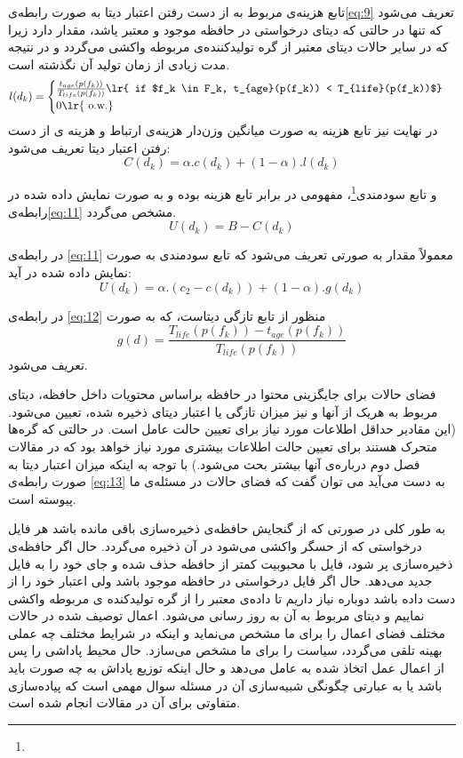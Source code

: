  تابع هزینه‌ی مربوط به از دست رفتن اعتبار دیتا به صورت رابطه‌ی\ref{eq:9} تعریف می‌شود که تنها در حالتی که دیتای درخواستی در حافظه موجود و معتبر یاشد، مقدار دارد زیرا که در سایر حالات دیتای معتبر از گره تولیدکننده‌ی مربوطه واکشی می‌گردد و در نتیجه مدت زیادی از زمان تولید آن نگذشته است. 
 \begin{equation}\label{eq:9}
 	l(d_k) = \begin{cases}
 		\frac{t_{age}(p(f_k))}{T_{life}(p(f_k))} \text{\lr{ if $f_k \in F_k, t_{age}(p(f_k)) < T_{life}(p(f_k))$}}\\
 		0 \text{\lr{ o.w.}}
 	\end{cases}
 \end{equation}  
  در نهایت نیز تابع هزینه به صورت میانگین وزن‌دار هزینه‌ی ارتباط و هزینه ی از دست رفتن اعتبار دیتا تعریف می‌شود:
  \begin{equation}\label{eq:10}
  	C(d_k) = \alpha . c(d_k) + (1 - \alpha) . l(d_k)
  \end{equation}

و تابع سودمندی\footnote{}، مفهومی در برابر تابع هزینه بوده و به صورت نمایش داده شده در رابطه‌ی\ref{eq:11} مشخص می‌گردد.
\begin{equation}\label{eq:11}
	U(d_k) = B - C(d_k)
\end{equation}

در رابطه‌ی \ref{eq:11} معمولاً مقدار  به صورتی تعریف می‌شود که تابع سودمندی به صورت نمایش داده شده در آید:
\begin{equation}\label{eq:12}
	U(d_k) = \alpha . (c_2 - c(d_k)) + (1 - \alpha) . g(d_k)
\end{equation}

در رابطه‌ی \ref{eq:12} منظور از تابع  تازگی دیتاست، که به صورت 
\begin{equation}\label{eq:13}
	g(d) = \frac{T_{life}(p(f_k)) - t_{age}(p(f_k))}{T_{life}(p(f_k))} 
\end{equation}  
تعریف می‌شود.

فضای حالات برای جایگزینی محتوا در حافظه براساس محتویات داخل حافظه، دیتای مربوط به هریک از آنها و نیز میزان تازگی یا اعتبار دیتای ذخیره شده، تعیین می‌شود. (این مقادیر حداقل اطلاعات مورد نیاز برای تعیین حالت عامل است. در حالتی که گره‌ها متحرک هستند برای تعیین حالت اطلاعات بیشتری مورد نیاز خواهد بود که در مقالات فصل دوم درباره‌ی آنها بیشتر بحث می‌شود.) با توجه به اینکه میزان اعتبار دیتا به صورت رابطه‌ی \ref{eq:13} به دست می‌آید می توان گفت که فضای حالات در مسئله‌ی ما پیوسته است. 

به طور کلی در صورتی که از گنجایش حافظه‌ی ذخیره‌سازی باقی مانده باشد هر فایل درخواستی که از حسگر واکشی می‌شود در آن ذخیره می‌گردد. حال اگر حافظه‌ی ذخیره‌سازی پر شود، فایل با محبوبیت کمتر از حافظه حذف شده و جای خود را به فایل جدید می‌دهد. حال اگر فایل درخواستی در حافظه موجود باشد ولی اعتبار خود را از دست داده باشد دوباره نیاز داریم تا داده‌ی معتبر را از گره تولیدکنده ی مربوطه واکشی نماییم و دیتای مربوط به آن به روز رسانی می‌شود. اعمال توصیف شده در حالات مختلف فضای اعمال را برای ما مشخص می‌نماید و اینکه در شرایط مختلف چه عملی بهینه تلقی می‌گردد، سیاست را برای ما مشخص می‌سازد. حال محیط پاداشی را پس از اعمال عمل اتخاذ شده به عامل می‌دهد و حال اینکه توزیع پاداش به چه صورت باید باشد یا به عبارتی چگونگی شبیه‌سازی آن در مسئله‌ سوال مهمی است که پیاده‌سازی متفاوتی برای آن در مقالات انجام شده است. 
 
